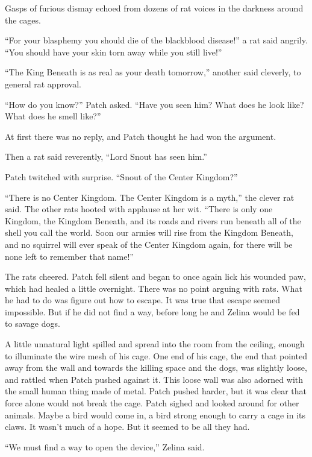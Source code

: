 \documentclass[ebook,oneside,openany,17pt]{memoir}
\newenvironment{tolerant}[1]{%
  \par\tolerance=#1\relax
}{%
  \par
}
\begin{document}
Gasps of furious dismay echoed from dozens of rat voices in the
darkness around the cages.

“For your blasphemy you should die of the blackblood disease!” a rat
said angrily. “You should have your skin torn away while you still
live!”

“The King Beneath is as real as your death tomorrow,” another said
cleverly, to general rat approval.

“How do you know?” Patch asked. “Have you seen him? What does he look
like? What does he smell like?”

At first there was no reply, and Patch thought he had won the
argument.

Then a rat said reverently, “Lord Snout has seen him.”

Patch twitched with surprise. “Snout of the Center Kingdom?”

\begin{tolerant}{1000}
“There is no Center Kingdom. The Center Kingdom is a myth,” the clever
rat said. The other rats hooted with applause at her wit. “There is
only one Kingdom, the Kingdom Beneath, and its roads and rivers run
beneath all of the shell you call the world. Soon our armies will rise
from the Kingdom Beneath, and no squirrel will ever speak of the
Center Kingdom again, for there will be none left to remember that
name!”
\end{tolerant}

The rats cheered. Patch fell silent and began to once again lick his
wounded paw, which had healed a little overnight. There was no point
arguing with rats. What he had to do was figure out how to escape. It
was true that escape seemed impossible. But if he did not find a way,
before long he and Zelina would be fed to savage dogs.

A little unnatural light spilled and spread into the room from the
ceiling, enough to illuminate the wire mesh of his cage. One end of
his cage, the end that pointed away from the wall and towards the
killing space and the dogs, was slightly loose, and rattled when Patch
pushed against it. This loose wall was also adorned with the small
human thing made of metal. Patch pushed harder, but it was clear that
force alone would not break the cage. Patch sighed and looked around
for other animals. Maybe a bird would come in, a bird strong enough to
carry a cage in its claws. It wasn’t much of a hope. But it seemed to
be all they had.

“We must find a way to open the device,” Zelina said.
\end{document}
